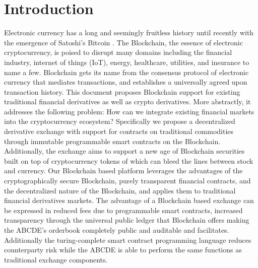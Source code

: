 \section{Introduction}

Electronic currency has a long and seemingly fruitless history until recently with the emergence of Satoshi's Bitcoin \cite{btc-whitepaper}. %
 The Blockchain, the essence of electronic cryptocurrency, is poised to disrupt many domains including the financial industry, internet of things (IoT), energy, healthcare, utilities, and insurance to name a few.
 Blockchain gets its name from the consensus protocol of electronic currency that mediates transactions, and establishes a universally agreed upon transaction history. %
% 
 This document proposes Blockchain support for existing traditional financial derivatives as well as crypto derivatives.
More abstractly, it addresses the following problem: How can we integrate existing financial markets into the cryptocurrency ecosystem? %
%
%
Specifically we propose a decentralized derivative exchange with support for contracts on traditional commodities through immutable programmable smart contracts on the Blockchain.
Additionally, the exchange aims to support a new age of Blockchain securities built on top of cryptocurrency tokens of which can bleed the lines between stock and currency.
 Our Blockchain based platform leverages the advantages of the cryptographically secure Blockchain, purely transparent financial contracts, and the decentralized nature of the Blockchain, and applies them to traditional financial derivatives markets. 
 The advantage of a Blockchain based exchange can be expressed in reduced fees due to programmable smart contracts, increased transparency through the universal public ledger that Blockchain offers making the ABCDE's orderbook completely public and auditable and facilitates. 
 Additionally the turing-complete smart contract programming language reduces counterparty risk while the ABCDE is able to perform the same functions as traditional exchange components. %

